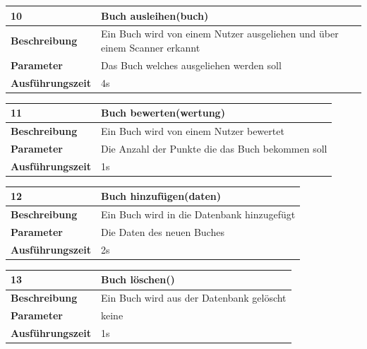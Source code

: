 \documentclass[fontsize=12pt,paper=a4,twoside]{scrartcl}
\begin{document}
  \begin{table}[htbp]
  \label{a10}
  \begin{tabular}{|l|p{10cm}|}
  \hline 
  \textbf{10} & \textbf{ Buch ausleihen(buch)} \\ \hline
  \textbf{Beschreibung} & Ein Buch wird von einem Nutzer ausgeliehen und über einem Scanner erkannt \\ \hline
  \textbf{Parameter} & Das Buch welches ausgeliehen werden soll \\ \hline
  \textbf{Ausführungszeit} & 4s\\ \hline
  \end{tabular}
  \end{table}

  \begin{table}[htbp]
  \label{a11}
  \begin{tabular}{|l|p{10cm}|}
  \hline 
  \textbf{11} & \textbf{Buch bewerten(wertung)} \\ \hline
  \textbf{Beschreibung} & Ein Buch wird von einem Nutzer bewertet\\ \hline
  \textbf{Parameter} & Die Anzahl der Punkte die das Buch bekommen soll \\ \hline
  \textbf{Ausführungszeit} & 1s\\ \hline
  \end{tabular}
  \end{table}

  \begin{table}[htbp]
  \label{a12}
  \begin{tabular}{|l|p{10cm}|}
  \hline 
  \textbf{12} & \textbf{Buch hinzufügen(daten)} \\ \hline
  \textbf{Beschreibung} & Ein Buch wird in die Datenbank hinzugefügt\\ \hline
  \textbf{Parameter} & Die Daten des neuen Buches \\ \hline
  \textbf{Ausführungszeit} & 2s\\ \hline
  \end{tabular}
  \end{table}

  \begin{table}[htbp]
  \label{a13}
  \begin{tabular}{|l|p{10cm}|}
  \hline 
  \textbf{13} & \textbf{Buch löschen()} \\ \hline
  \textbf{Beschreibung} & Ein Buch wird aus der Datenbank gelöscht\\ \hline
  \textbf{Parameter} & keine \\ \hline
  \textbf{Ausführungszeit} & 1s\\ \hline
  \end{tabular}
  \end{table}
\end{document}
